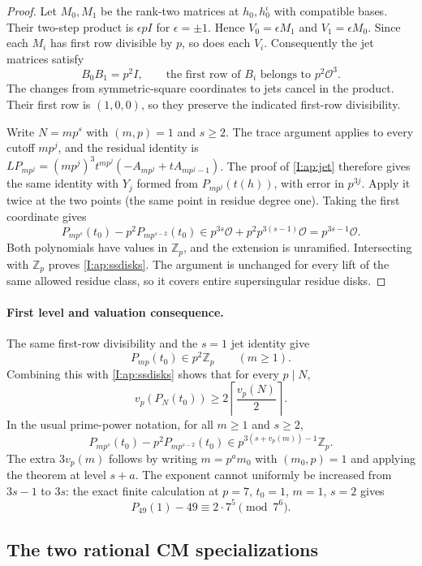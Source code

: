 \documentclass[11pt,letterpaper]{article}
\theoremstyle{definition}
\theoremstyle{remark}
\begin{document}
\begin{proof}
Let $M_0,M_1$ be the rank-two matrices at $h_0,h_0^\iota$ with compatible
bases. Their two-step product is $\epsilon pI$ for $\epsilon=\pm1$.
Hence $V_0=\epsilon M_1$ and $V_1=\epsilon M_0$. Since each $M_i$ has
first row divisible by $p$, so does each $V_i$. Consequently the jet
matrices satisfy
\[
 B_0B_1=p^2I,\qquad\text{the first row of }B_i\text{ belongs to }p^2\mathcal O^3.
\]
The changes from symmetric-square coordinates to jets cancel in the
product. Their first row is $(1,0,0)$, so they preserve the indicated
first-row divisibility.

Write $N=mp^s$ with $(m,p)=1$ and $s\geq2$. The trace argument applies
to every cutoff $mp^j$, and the residual identity is
$L P_{mp^j}=(mp^j)^3 t^{mp^j}(-A_{mp^j}+tA_{mp^j-1})$.
The proof of \eqref{I:ap:jet} therefore gives the same identity with
$Y_j$ formed from $P_{mp^j}(t(h))$, with error in $p^{3j}$.
Apply it twice at the two points (the same point in residue degree one).
Taking the first coordinate gives
\[
 P_{mp^s}(t_0)-p^2P_{mp^{s-2}}(t_0)
       \in p^{3s}\mathcal O+p^2p^{3(s-1)}\mathcal O
       =p^{3s-1}\mathcal O.
\]
Both polynomials have values in $\mathbb Z_p$, and the extension is
unramified. Intersecting with $\mathbb Z_p$ proves
\eqref{I:ap:ssdisks}. The argument is unchanged for every lift of the
same allowed residue class, so it covers entire supersingular residue
disks.
\end{proof}

\paragraph{First level and valuation consequence.}
The same first-row divisibility and the $s=1$ jet identity give
\[
 P_{mp}(t_0)\in p^2\mathbb Z_p\qquad(m\geq1).
\]
Combining this with \eqref{I:ap:ssdisks} shows that for every $p\mid N$,
\[
 v_p(P_N(t_0))\geq 2\left\lceil\frac{v_p(N)}2\right\rceil.
\]
In the usual prime-power notation, for all $m\geq1$ and $s\geq2$,
\[
 P_{mp^s}(t_0)-p^2P_{mp^{s-2}}(t_0)
 \in p^{3(s+v_p(m))-1}\mathbb Z_p.
\]
The extra $3v_p(m)$ follows by writing $m=p^a m_0$ with $(m_0,p)=1$
and applying the theorem at level $s+a$.
The exponent cannot uniformly be increased from $3s-1$ to $3s$:
the exact finite calculation at $p=7$, $t_0=1$, $m=1$, $s=2$ gives
\[
 P_{49}(1)-49\equiv 2\cdot7^5\pmod{7^6}.
\]

\subsection{The two rational CM specializations}
\end{document}
